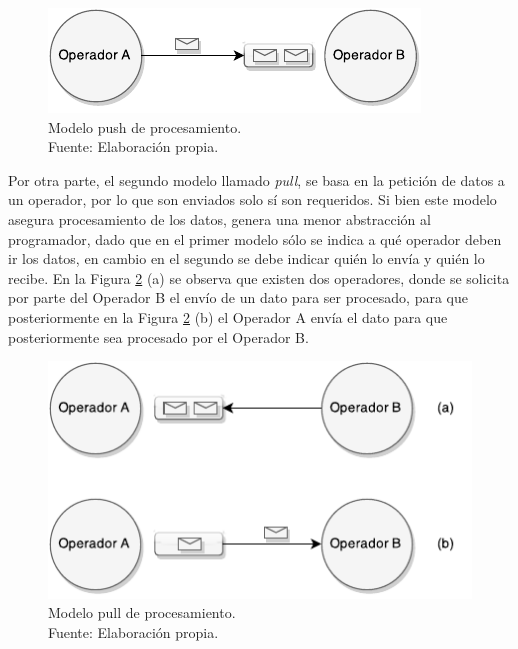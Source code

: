 \begin{figure}[ht!]
  \centering
    \includegraphics[scale=1]{images/SPS-Push.pdf}
  \caption[Modelo push de procesamiento.]{Modelo push de procesamiento.\\Fuente: Elaboración propia.}
  \label{fig:sps-push}
\end{figure}

Por otra parte, el segundo modelo llamado \textit{pull}, se basa en la petici\'on de datos a un operador, por lo que son enviados solo s\'i son requeridos. Si bien este modelo asegura procesamiento de los datos, genera una menor abstracci\'on al programador, dado que en el primer modelo s\'olo se indica a \normalsize{qu\'e} operador deben ir los datos, en cambio en el segundo se debe indicar qui\'en lo env\'ia y qui\'en lo recibe. En la Figura \ref{fig:sps-pull} (a) se observa que existen dos operadores, donde se solicita por parte del Operador B el env\'io de un dato para ser procesado, para que posteriormente en la Figura \ref{fig:sps-pull} (b) el Operador A env\'ia el dato para que posteriormente sea procesado por el Operador B.

\begin{figure}[ht!]
  \centering
    \includegraphics[scale=1]{images/SPS-Pull.pdf}
  \caption[Modelo pull de procesamiento.]{Modelo pull de procesamiento.\\Fuente: Elaboración propia.}
  \label{fig:sps-pull}
\end{figure}

